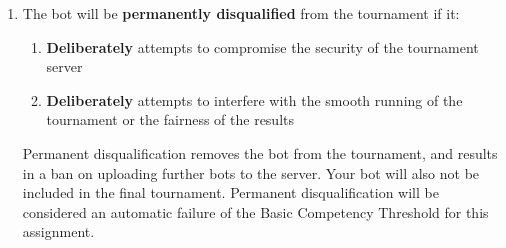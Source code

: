 \documentclass{../../fal_assignment}
\begin{document}
\begin{enumerate}
	\item The bot will be \textbf{permanently disqualified} from the tournament if it:
		\begin{enumerate}
			\item \textbf{Deliberately} attempts to compromise the security of the tournament server
			\item \textbf{Deliberately} attempts to interfere with the smooth running of the tournament or the fairness of the results
		\end{enumerate}
		Permanent disqualification removes the bot from the tournament, and results in a ban on uploading further bots to the server.
		Your bot will also not be included in the final tournament.
		Permanent disqualification will be considered an automatic failure of the Basic Competency Threshold for this assignment.
\end{enumerate}
\end{document}
